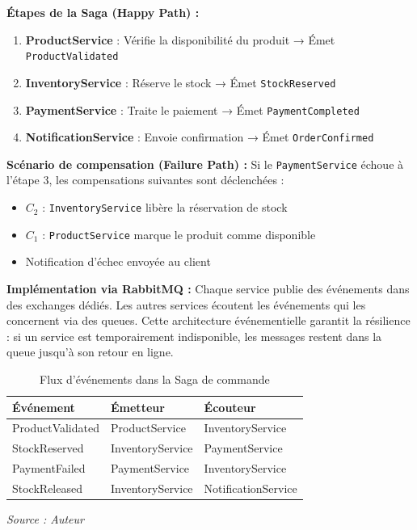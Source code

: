 \textbf{Étapes de la Saga (Happy Path) :}
\begin{enumerate}
    \item \textbf{ProductService} : Vérifie la disponibilité du produit → Émet \texttt{ProductValidated}
    \item \textbf{InventoryService} : Réserve le stock → Émet \texttt{StockReserved}
    \item \textbf{PaymentService} : Traite le paiement → Émet \texttt{PaymentCompleted}
    \item \textbf{NotificationService} : Envoie confirmation → Émet \texttt{OrderConfirmed}
\end{enumerate}

\textbf{Scénario de compensation (Failure Path) :}
Si le \texttt{PaymentService} échoue à l'étape 3, les compensations suivantes sont déclenchées :
\begin{itemize}
    \item $C_2$ : \texttt{InventoryService} libère la réservation de stock
    \item $C_1$ : \texttt{ProductService} marque le produit comme disponible
    \item Notification d'échec envoyée au client
\end{itemize}

\textbf{Implémentation via RabbitMQ :}
Chaque service publie des événements dans des exchanges dédiés. Les autres services écoutent les événements qui les concernent via des queues. Cette architecture événementielle garantit la résilience : si un service est temporairement indisponible, les messages restent dans la queue jusqu'à son retour en ligne.

\begin{table}[htbp]
    \centering
    \begin{tabular}{|l|l|l|}
        \hline
        \textbf{Événement} & \textbf{Émetteur} & \textbf{Écouteur} \\
        \hline
        ProductValidated & ProductService & InventoryService \\
        \hline
        StockReserved & InventoryService & PaymentService \\
        \hline
        PaymentFailed & PaymentService & InventoryService \\
        \hline
        StockReleased & InventoryService & NotificationService \\
        \hline
    \end{tabular}
    \caption{Flux d'événements dans la Saga de commande}
    \vspace{0.2cm}\small\textit{Source : Auteur}
    \label{tab:saga_events}
\end{table}

